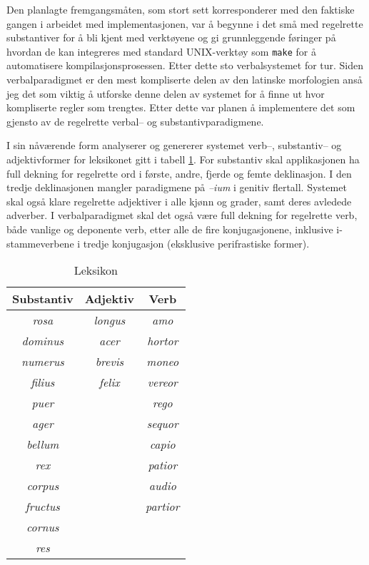 \documentclass{article}
\newcommand\note[1]{\marginpar{\raggedright\tiny#1}}
\let\prog\texttt
\let\w\emph
\begin{document}
Den planlagte fremgangsm\aa{}ten, som stort sett korresponderer med den
faktiske gangen i arbeidet med implementasjonen, var \aa{} begynne i det
sm\aa{} med regelrette substantiver for \aa{} bli kjent med verkt\o{}yene og
gi grunnleggende f\o{}ringer p\aa{} hvordan de kan integreres med standard
UNIX-verkt\o{}y som \prog{make} for \aa{} automatisere kompilasjonsprosessen.
Etter dette sto verbalsystemet for tur. Siden verbalparadigmet er den mest
kompliserte delen av den latinske morfologien ans\aa{} jeg det som viktig
\aa{} utforske denne delen av systemet for \aa{} finne ut hvor kompliserte
regler som trengtes. Etter dette var planen \aa{} implementere det som gjensto
av de regelrette verbal-- og substantivparadigmene.

I sin n\aa{}v\ae{}rende form analyserer og genererer systemet verb--,
substantiv-- og adjektivformer for leksikonet gitt i tabell \ref{leksikon}.
For substantiv skal applikasjonen ha full dekning for regelrette ord i
f\o{}rste, andre, fjerde og femte deklinasjon. I den tredje deklinasjonen
mangler paradigmene p\aa{} \w{--ium} i genitiv flertall. Systemet skal
ogs\aa{} klare regelrette adjektiver i alle kj\o{}nn og grader, samt deres
avledede adverber. I verbalparadigmet skal det ogs\aa{} v\ae{}re full dekning
for regelrette verb, b\aa{}de vanlige og deponente verb, etter alle de fire
konjugasjonene, inklusive i-stammeverbene i tredje konjugasjon (eksklusive
perifrastiske former).

\begin{table}
\begin{center}
\begin{tabular}{|ccc|}
    \hline
Substantiv  & Adjektiv   & Verb \\
    \hline
\w{rosa}    & \w{longus} & \w{amo}     \\
\w{dominus} & \w{acer}   & \w{hortor}  \\
\w{numerus} & \w{brevis} & \w{moneo}   \\
\w{filius}  & \w{felix}  & \w{vereor}  \\
\w{puer}    &            & \w{rego}    \\
\w{ager}    &            & \w{sequor}  \\
\w{bellum}  &            & \w{capio}   \\
\w{rex}     &            & \w{patior}  \\
\w{corpus}  &            & \w{audio}   \\
\w{fructus} &            & \w{partior} \\
\w{cornus}  &            &             \\
\w{res}     &            &             \\
    \hline
\end{tabular}
\end{center}
\caption{Leksikon}
\label{leksikon}
\end{table}
\end{document}
